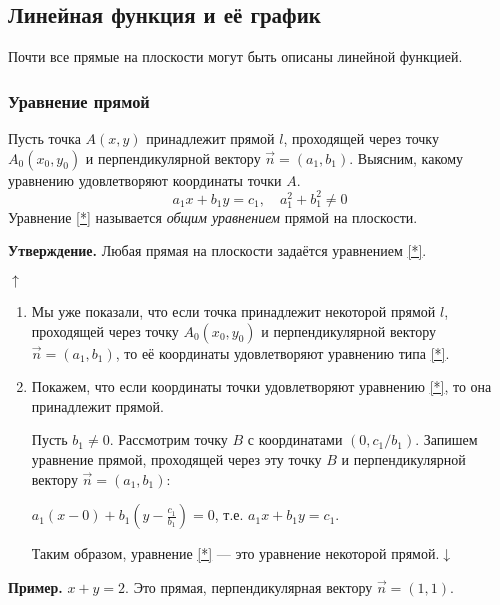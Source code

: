 \documentclass{article}
\begin{document}
    \subsection{Линейная функция и её график}

    Почти все прямые на плоскости могут быть описаны линейной функцией.

    \subsubsection{Уравнение прямой}

    Пусть точка \(A(x,y)\) принадлежит прямой \(l\), проходящей через точку \(A_0(x_0, y_0)\) и перпендикулярной вектору \(\overset{\rightarrow}{n} = (a_1, b_1)\). Выясним, какому уравнению удовлетворяют координаты точки \(A\).
    \begin{equation}\label{*}
        a_1x + b_1y = c_1,\quad a_1^2 + b_1^2 \not = 0
    \end{equation}
    Уравнение \ref{*} называется \textit{общим уравнением} прямой на плоскости.

    \textbf{Утверждение.} Любая прямая на плоскости задаётся уравнением \ref{*}.

    \(\uparrow\)
    \begin{enumerate}
        \item Мы уже показали, что если точка принадлежит некоторой прямой \(l\), проходящей через точку \(A_0(x_0, y_0)\)
        и перпендикулярной вектору \(\overset{\rightarrow}{n} = (a_1, b_1)\), то её координаты удовлетворяют уравнению типа \ref{*}.
        \item Покажем, что если координаты точки удовлетворяют уравнению \ref{*}, то она принадлежит прямой.
        
        Пусть \(b_1 \not = 0\). Рассмотрим точку \(B\) с координатами \((0, c_1/b_1)\). Запишем уравнение прямой, проходящей через эту точку \(B\) и перпендикулярной вектору \(\overset{\rightarrow}{n} = (a_1, b_1)\):

        \(a_1(x-0) + b_1(y - \frac{c_1}{b_1}) = 0\), т.е. \(a_1x+b_1y=c_1\).

        Таким образом, уравнение \ref{*} --- это уравнение некоторой прямой.\quad \(\downarrow\)
    \end{enumerate}

    \textbf{Пример.} \(x+y=2\). Это прямая, перпендикулярная вектору \(\overset{\rightarrow}{n} = (1, 1)\).
\end{document}
